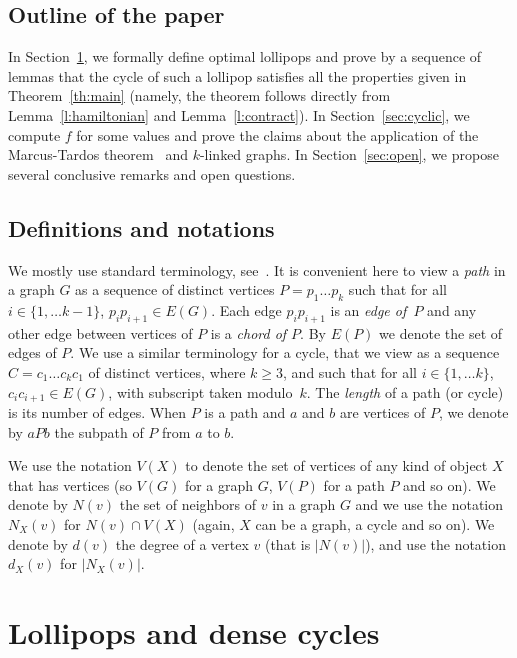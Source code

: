 \documentclass[11pt]{article}
\begin{document}
    \subsection*{Outline of the paper}

        In Section~\ref{sec:proofs}, we formally define optimal lollipops and prove by a sequence of lemmas that the cycle of such a lollipop satisfies all the properties given in Theorem~\ref{th:main} (namely, the theorem follows directly from Lemma~\ref{l:hamiltonian} and Lemma~\ref{l:contract}). In Section~\ref{sec:cyclic}, we compute $f$ for some values and prove the claims about the application of the Marcus-Tardos theorem~\cite{MARCUS2004153} and $k$-linked graphs.  In Section~\ref{sec:open}, we propose several conclusive remarks and open questions. 

    \subsection*{Definitions and notations}

    We mostly use standard terminology, see~\cite{diestel:graph}. It is convenient here to view a \emph{path} in a graph $G$ as a sequence of distinct vertices $P= p_1 \dots p_k$ such that for all $i\in \{1, \dots k-1\}$, $p_ip_{i+1} \in E(G)$.  Each edge $p_ip_{i+1}$ is an \emph{edge of~$P$} and any other edge between vertices of $P$ is a \emph{chord of $P$}. By $E(P)$ we denote the set of edges of $P$. We use a similar terminology for a cycle, that we view as a sequence $C = c_1 \dots c_kc_1$ of distinct vertices, where $k\geq 3$, and such that for all $i\in \{1, \dots k\}$, $c_ic_{i+1} \in E(G)$, with subscript taken modulo~$k$. The \emph{length} of a path (or cycle) is its number of edges. 
    When $P$ is a path and $a$ and $b$ are vertices of $P$, we denote by $aPb$ the subpath of $P$ from $a$ to $b$. 
    
    We use the notation $V(X)$ to denote the set of vertices of any kind of object $X$ that has vertices (so $V(G)$ for a graph $G$, $V(P)$ for a path $P$ and so on). We denote by $N(v)$ the set of neighbors of $v$ in a graph $G$ and we use the notation $N_X(v)$ for $N(v) \cap V(X)$ (again, $X$ can be a graph, a cycle and so on).  We denote by $d(v)$ the degree of a vertex $v$ (that is $|N(v)|$), and use the notation $d_X(v)$ for $|N_X(v)|$. 
     



\section{Lollipops and dense cycles}
\label{sec:proofs}
\end{document}
